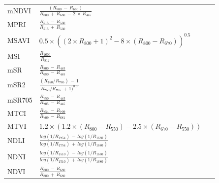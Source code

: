 \documentclass[remotesensing,article,accept,moreauthors,pdftex]{Definitions/mdpi}
\begin{document}
\begin{paracol}{2}
\begin{specialtable}[H]
{\begin{tabular}{lll}
		mNDVI           & $\frac{(R_{800}\,-\,R_{680})}{R_{800}\,+\,R_{680}\,-\,2 \,\times\, R_{445}}$                                         &~\cite{sims2002}              \\
		MPRI            & $\frac{R_{515}\,-\,R_{530}}{R_{515}\,+\,R_{530}}$                                                            &~\cite{hernandez-clemente2011} \\
		MSAVI           & \parbox{5.5cm}{$0.5 \times ((2\times R_{800}+1)^2-8\times (R_{800}-R_{670}))^{0.5}$}                 &~\cite{qi1994}                 \\
		MSI             & $\frac{R_{1600}}{R_{817}}$                                                                           &~\cite{hunt1989}               \\
		mSR             & $\frac{R_{800}\,-\,R_{445}}{R_{680}\,-\,R_{445}}$                                                            &~\cite{sims2002}              \\
		mSR2            & $\frac{(R_{750}/R_{705})\,-\,1}{R_{750}/R_{705}\,+\,1)^{0.5}}$                                               &~\cite{chen1996}               \\
		mSR705          & $\frac{R_{750}\,-\,R_{445}}{R_{705}\,-\,R_{445}}$                                                            &~\cite{sims2002}              \\
		MTCI            & $\frac{R_{754}\,-\,R_{709}}{R_{709}\,-\,R_{681}}$                                                            &~\cite{dash2007}               \\
		\midrule
		MTVI            & \parbox{3.8cm}{$1.2 \times (1.2 \times (R_{800}-R_{550})-2.5 \times (R_{670}-R_{550}))$}             &~\cite{haboudane2002}          \\
		\midrule
		NDLI            & $\frac{log(1/R_{1754}) \,-\, log(1/R_{1680})}{log(1/R_{1754}) \,+\, log(1/R_{1680})}$                        &~\cite{serrano2002}            \\
		NDNI            & $\frac{log(1/R_{1510}) \,-\, log(1/R_{1680})}{log(1/R_{1510}) \,+\, log(1/R_{1680})}$                        &~\cite{serrano2002}            \\
		NDVI            & $\frac{R_{800}\,-\,R_{680}}{R_{800}\,+\,R_{680}}$                                                            &~\cite{tucker1979}             \\

\end{tabular}}
\end{specialtable}
\end{paracol}
\end{document}
